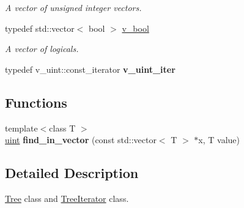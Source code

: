 \begin{DoxyCompactItemize}
\begin{DoxyCompactList}\small\item\em A vector of unsigned integer vectors. \end{DoxyCompactList}\item 
\mbox{\label{namespacepruner_a7f5576bfe937fd464f6f67ed49997da3}} 
typedef std\+::vector$<$ bool $>$ \hyperlink{namespacepruner_a7f5576bfe937fd464f6f67ed49997da3}{v\+\_\+bool}
\begin{DoxyCompactList}\small\item\em A vector of logicals. \end{DoxyCompactList}\item 
\mbox{\label{namespacepruner_adb695993f778a41bcfc1eed151f9c0bd}} 
typedef v\+\_\+uint\+::const\+\_\+iterator {\bfseries v\+\_\+uint\+\_\+iter}
\end{DoxyCompactItemize}
\subsection*{Functions}
\begin{DoxyCompactItemize}
\item 
\mbox{\label{namespacepruner_a351966f6c1802af422254d6ee004eea6}} 
{\footnotesize template$<$class T $>$ }\\\hyperlink{namespacepruner_a659e6e64a9e2b8e981c3d34262a2f67e}{uint} {\bfseries find\+\_\+in\+\_\+vector} (const std\+::vector$<$ T $>$ $\ast$x, T value)
\end{DoxyCompactItemize}


\subsection{Detailed Description}
\hyperlink{classpruner_1_1Tree}{Tree} class and \hyperlink{classpruner_1_1TreeIterator}{Tree\+Iterator} class. 